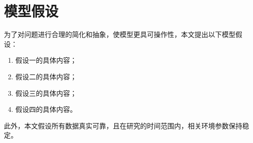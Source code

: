 
\section{模型假设}

为了对问题进行合理的简化和抽象，使模型更具可操作性，本文提出以下模型假设：

\begin{enumerate}
	\item 假设一的具体内容；
	\item 假设二的具体内容；
	\item 假设三的具体内容；
	\item 假设四的具体内容。
\end{enumerate}

此外，本文假设所有数据真实可靠，且在研究的时间范围内，相关环境参数保持稳定。
